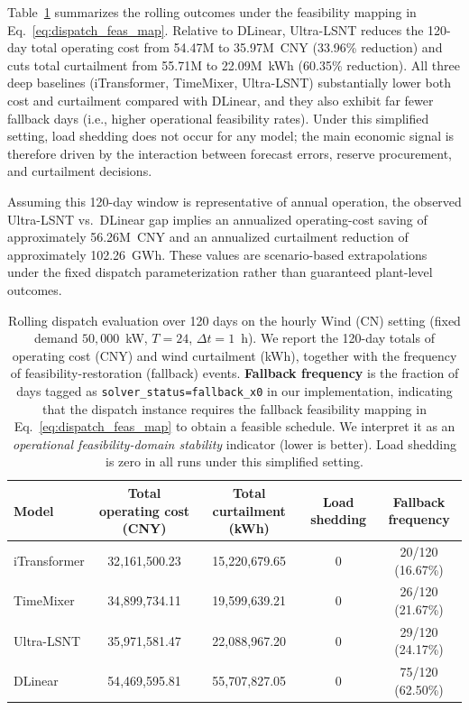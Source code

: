 \documentclass[review,3p,times]{elsarticle}
\begin{document}
Table~\ref{tab:dispatch_rolling} summarizes the rolling outcomes under the feasibility mapping in Eq.~\ref{eq:dispatch_feas_map}. Relative to DLinear, Ultra-LSNT reduces the 120-day total operating cost from 54.47M to 35.97M~CNY (33.96\% reduction) and cuts total curtailment from 55.71M to 22.09M~kWh (60.35\% reduction). All three deep baselines (iTransformer, TimeMixer, Ultra-LSNT) substantially lower both cost and curtailment compared with DLinear, and they also exhibit far fewer fallback days (i.e., higher operational feasibility rates). Under this simplified setting, load shedding does not occur for any model; the main economic signal is therefore driven by the interaction between forecast errors, reserve procurement, and curtailment decisions.

Assuming this 120-day window is representative of annual operation, the observed Ultra-LSNT vs.\ DLinear gap implies an annualized operating-cost saving of approximately 56.26M~CNY and an annualized curtailment reduction of approximately 102.26~GWh. These values are scenario-based extrapolations under the fixed dispatch parameterization rather than guaranteed plant-level outcomes.




\begin{table}[t]
\centering
\caption{Rolling dispatch evaluation over 120 days on the hourly Wind (CN) setting (fixed demand $50{,}000$~kW, $T=24$, $\Delta t=1$~h). We report the 120-day totals of operating cost (CNY) and wind curtailment (kWh), together with the frequency of feasibility-restoration (fallback) events. \textbf{Fallback frequency} is the fraction of days tagged as \texttt{solver\_status=fallback\_x0} in our implementation, indicating that the dispatch instance requires the fallback feasibility mapping in Eq.~\ref{eq:dispatch_feas_map} to obtain a feasible schedule. We interpret it as an \emph{operational feasibility-domain stability} indicator (lower is better). Load shedding is zero in all runs under this simplified setting.}
\label{tab:dispatch_rolling}
\begin{tabular}{lcccc}
\toprule
Model & Total operating cost (CNY) & Total curtailment (kWh) & Load shedding & Fallback frequency \\
\midrule
iTransformer & 32{,}161{,}500.23 & 15{,}220{,}679.65 & 0 & 20/120 (16.67\%) \\
TimeMixer & 34{,}899{,}734.11 & 19{,}599{,}639.21 & 0 & 26/120 (21.67\%) \\
Ultra-LSNT & 35{,}971{,}581.47 & 22{,}088{,}967.20 & 0 & 29/120 (24.17\%) \\
DLinear & 54{,}469{,}595.81 & 55{,}707{,}827.05 & 0 & 75/120 (62.50\%) \\
\bottomrule
\end{tabular}
\end{table}
\end{document}
